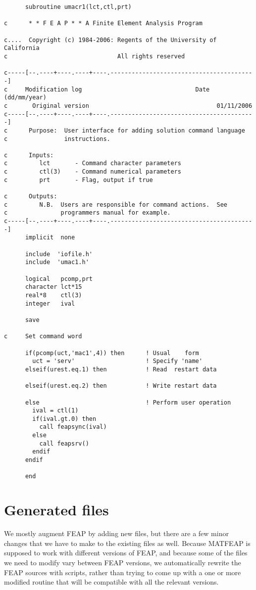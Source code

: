 \begin{verbatim}
      subroutine umacr1(lct,ctl,prt)

c      * * F E A P * * A Finite Element Analysis Program

c....  Copyright (c) 1984-2006: Regents of the University of California
c                               All rights reserved

c-----[--.----+----.----+----.-----------------------------------------]
c     Modification log                                Date (dd/mm/year)
c       Original version                                    01/11/2006
c-----[--.----+----.----+----.-----------------------------------------]
c      Purpose:  User interface for adding solution command language
c                instructions.

c      Inputs:
c         lct       - Command character parameters
c         ctl(3)    - Command numerical parameters
c         prt       - Flag, output if true

c      Outputs:
c         N.B.  Users are responsible for command actions.  See
c               programmers manual for example.
c-----[--.----+----.----+----.-----------------------------------------]
      implicit  none

      include  'iofile.h'
      include  'umac1.h'

      logical   pcomp,prt
      character lct*15
      real*8    ctl(3)
      integer   ival

      save

c     Set command word

      if(pcomp(uct,'mac1',4)) then      ! Usual    form
        uct = 'serv'                    ! Specify 'name'
      elseif(urest.eq.1) then           ! Read  restart data

      elseif(urest.eq.2) then           ! Write restart data

      else                              ! Perform user operation
        ival = ctl(1)
        if(ival.gt.0) then
          call feapsync(ival)
        else
          call feapsrv()
        endif
      endif

      end
\end{verbatim}
 \section{Generated files}

 We mostly augment FEAP by adding new files, but there are a few minor
 changes that we have to make to the existing files as well.  Because
 MATFEAP is supposed to work with different versions of FEAP, and because
 some of the files we need to modify vary between FEAP versions, we
 automatically rewrite the FEAP sources with scripts, rather than trying
 to come up with a one or more modified routine that will be compatible with
 all the relevant versions.

